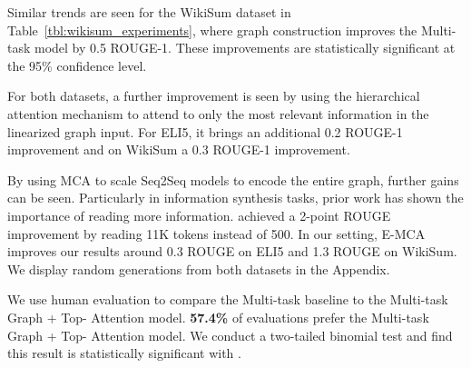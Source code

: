\documentclass[11pt,a4paper]{article}
\begin{document}
Similar trends are seen for the WikiSum dataset in Table~\ref{tbl:wikisum_experiments}, where graph construction improves the  Multi-task model by 0.5 ROUGE-1. These improvements are statistically significant at the 95\% confidence level. 

For both datasets, a further improvement is seen by using the hierarchical attention mechanism to attend to only the most relevant information in the linearized graph input. For ELI5, it brings an additional 0.2 ROUGE-1 improvement and on WikiSum a 0.3 ROUGE-1 improvement. 

By using MCA to scale Seq2Seq models to encode the entire graph, further gains can be seen. Particularly in information synthesis tasks, prior work has shown the importance of reading more information. \citet{liu2018generating} achieved a 2-point ROUGE improvement by reading 11K tokens instead of 500. In our setting, E-MCA improves our results around 0.3 ROUGE on ELI5 and 1.3 ROUGE on WikiSum. We display random generations from both datasets in the Appendix.

We use human evaluation to compare the Multi-task baseline to the Multi-task Graph + Top- Attention model. \textbf{57.4\%} of evaluations prefer the Multi-task Graph + Top- Attention model. We conduct a two-tailed binomial test and find this result is statistically significant with .
\end{document}
